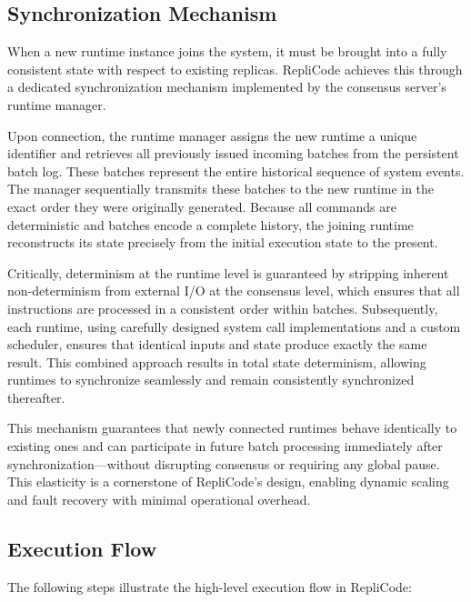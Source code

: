 \documentclass[10pt, 
]{IEEEtran}
\begin{document}
\subsection{Synchronization Mechanism}
When a new runtime instance joins the system, it must be brought into a fully consistent state with respect to existing replicas. RepliCode achieves this through a dedicated synchronization mechanism implemented by the consensus server's runtime manager.

Upon connection, the runtime manager assigns the new runtime a unique identifier and retrieves all previously issued incoming batches from the persistent batch log. These batches represent the entire historical sequence of system events. The manager sequentially transmits these batches to the new runtime in the exact order they were originally generated. Because all commands are deterministic and batches encode a complete history, the joining runtime reconstructs its state precisely from the initial execution state to the present.

Critically, determinism at the runtime level is guaranteed by stripping inherent non-determinism from external I/O at the consensus level, which ensures that all instructions are processed in a consistent order within batches. Subsequently, each runtime, using carefully designed system call implementations and a custom scheduler, ensures that identical inputs and state produce exactly the same result. This combined approach results in total state determinism, allowing runtimes to synchronize seamlessly and remain consistently synchronized thereafter.

This mechanism guarantees that newly connected runtimes behave identically to existing ones and can participate in future batch processing immediately after synchronization—without disrupting consensus or requiring any global pause. This elasticity is a cornerstone of RepliCode's design, enabling dynamic scaling and fault recovery with minimal operational overhead.

\subsection{Execution Flow}

The following steps illustrate the high-level execution flow in RepliCode:
\end{document}
